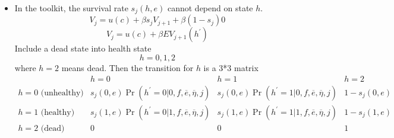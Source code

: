 \documentclass[12pt,a4paper]{article}
\begin{document}
\begin{itemize}
\item In the toolkit, the survival rate $s_{j}(h,e)$ cannot depend on state $%
h$.%
\begin{equation*}
V_{j}=u(c)+\beta s_{j}V_{j+1}+\beta \left( 1-s_{j}\right) 0
\end{equation*}%
\begin{equation*}
V_{j}=u(c)+\beta EV_{j+1}\left( h^{\prime }\right) 
\end{equation*}%
Include a dead state into health state%
\begin{equation*}
h=0,1,2
\end{equation*}%
where $h=2$ means dead. Then the transition for $h$ is a 3*3 matrix%
\begin{equation*}
\begin{array}{lccc}
& h=0 & h=1 & h=2 \\ 
h=0\text{ (unhealthy)} & s_{j}\left( 0,e\right) \Pr \left( h^{\prime }=0|0,f,%
\overline{e},\overline{\eta },j\right)  & s_{j}\left( 0,e\right) \Pr \left(
h^{\prime }=1|0,f,\overline{e},\overline{\eta },j\right)  & 1-s_{j}\left(
0,e\right)  \\ 
h=1\text{ (healthy)} & s_{j}(1,e)\Pr \left( h^{\prime }=0|1,f,\overline{e},%
\overline{\eta },j\right)  & s_{j}(1,e)\Pr \left( h^{\prime }=1|1,f,%
\overline{e},\overline{\eta },j\right)  & 1-s_{j}(1,e) \\ 
h=2\text{ (dead)} & 0 & 0 & 1%
\end{array}%
\end{equation*}
\end{itemize}
\end{document}
